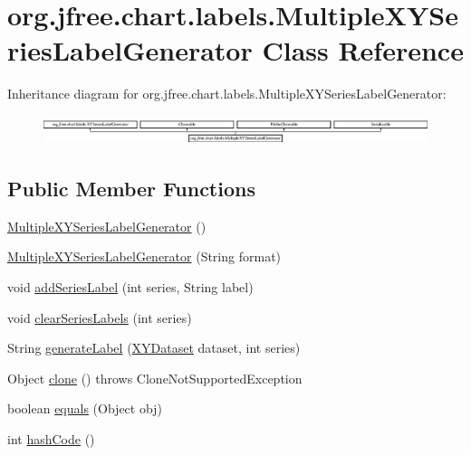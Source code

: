 \hypertarget{classorg_1_1jfree_1_1chart_1_1labels_1_1_multiple_x_y_series_label_generator}{}\section{org.\+jfree.\+chart.\+labels.\+Multiple\+X\+Y\+Series\+Label\+Generator Class Reference}
\label{classorg_1_1jfree_1_1chart_1_1labels_1_1_multiple_x_y_series_label_generator}
Inheritance diagram for org.\+jfree.\+chart.\+labels.\+Multiple\+X\+Y\+Series\+Label\+Generator\+:\begin{figure}[H]
\begin{center}
\leavevmode
\includegraphics[height=0.851064cm]{classorg_1_1jfree_1_1chart_1_1labels_1_1_multiple_x_y_series_label_generator}
\end{center}
\end{figure}
\subsection*{Public Member Functions}
\begin{DoxyCompactItemize}
\item 
\mbox{\hyperlink{classorg_1_1jfree_1_1chart_1_1labels_1_1_multiple_x_y_series_label_generator_a5aecc9f15096860ec4fef20a0d789d4c}{Multiple\+X\+Y\+Series\+Label\+Generator}} ()
\item 
\mbox{\hyperlink{classorg_1_1jfree_1_1chart_1_1labels_1_1_multiple_x_y_series_label_generator_ab3de4a135b81881ab0186823a31c5b41}{Multiple\+X\+Y\+Series\+Label\+Generator}} (String format)
\item 
void \mbox{\hyperlink{classorg_1_1jfree_1_1chart_1_1labels_1_1_multiple_x_y_series_label_generator_a52b69c7ed3566c47bfb675f684196f23}{add\+Series\+Label}} (int series, String label)
\item 
void \mbox{\hyperlink{classorg_1_1jfree_1_1chart_1_1labels_1_1_multiple_x_y_series_label_generator_a1f8b7920dbbcccb45f0012a5159697cf}{clear\+Series\+Labels}} (int series)
\item 
String \mbox{\hyperlink{classorg_1_1jfree_1_1chart_1_1labels_1_1_multiple_x_y_series_label_generator_a47ff6008d9b39786f639149605081f0f}{generate\+Label}} (\mbox{\hyperlink{interfaceorg_1_1jfree_1_1data_1_1xy_1_1_x_y_dataset}{X\+Y\+Dataset}} dataset, int series)
\item 
Object \mbox{\hyperlink{classorg_1_1jfree_1_1chart_1_1labels_1_1_multiple_x_y_series_label_generator_af8470726d2a76de2d24a59bb82c2b3fb}{clone}} ()  throws Clone\+Not\+Supported\+Exception 
\item 
boolean \mbox{\hyperlink{classorg_1_1jfree_1_1chart_1_1labels_1_1_multiple_x_y_series_label_generator_a3ca7a9d244ac4c428ba5b904267a0cff}{equals}} (Object obj)
\item 
int \mbox{\hyperlink{classorg_1_1jfree_1_1chart_1_1labels_1_1_multiple_x_y_series_label_generator_abbf9f8b955c2e41a734c147c669b1b59}{hash\+Code}} ()
\end{DoxyCompactItemize}
